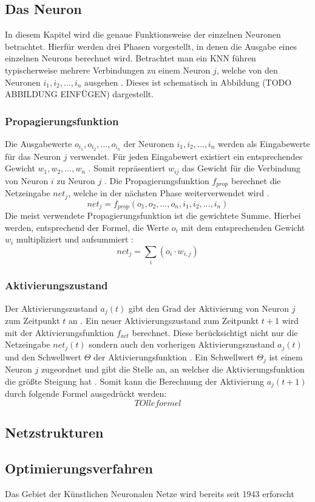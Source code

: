 \subsection{Das Neuron}
\label{subsec:neuron}
In diesem Kapitel wird die genaue Funktionsweise der einzelnen Neuronen betrachtet. Hierfür werden drei Phasen vorgestellt, in denen die Ausgabe eines einzelnen Neurons berechnet wird. Betrachtet man ein \ac{KNN} führen typischerweise mehrere Verbindungen zu einem Neuron $j$, welche von den Neuronen $i_1, i_2, ..., i_n$ ausgehen \cite{kriesel2008kleiner}. Dieses ist schematisch in Abbildung (TODO ABBILDUNG EINFÜGEN) dargestellt.

\subsubsection{Propagierungsfunktion} 
Die Ausgabewerte $o_{i_1}, o_{i_2}, ..., o_{i_n}$ der Neuronen $i_1, i_2, ..., i_n$ werden als Eingabewerte für das Neuron $j$ verwendet. Für jeden Eingabewert existiert ein entsprechendes Gewicht $w_1, w_2, ..., w_n$ \cite{kriesel2008kleiner}. Somit repräsentiert $w_{ij}$ das Gewicht für die Verbindung von Neuron $i$ zu Neuron $j$ \cite{zell2003simulation}. Die Propagierungsfunktion $f_{prop}$ berechnet die Netzeingabe $net_j$, welche in der nächsten Phase weiterverwendet wird \cite{kriesel2008kleiner}. 
$$net_j=f_{prop}(o_1, o_2, ..., o_n, i_1, i_2, ..., i_n)$$
Die meist verwendete Propagierungsfunktion ist die gewichtete Summe. Hierbei werden, entsprechend der Formel, die Werte $o_i$ mit dem entsprechenden Gewicht $w_i$ multipliziert und aufsummiert \cite{kriesel2008kleiner}:
$$net_j=\sum_{i}(o_{i} \cdot w_{i, j})$$

\subsubsection{Aktivierungszustand}
Der Aktivierungszustand $a_j(t)$ gibt den Grad der Aktivierung von Neuron $j$ zum Zeitpunkt $t$ an \cite{zell2003simulation}. Ein neuer Aktivierungszustand zum Zeitpunkt $t+1$ wird mit der Aktivierungsfunktion $f_{act}$ berechnet. Diese berücksichtigt nicht nur die Netzeingabe $net_j(t)$ sondern auch den vorherigen Aktivierungszustand $a_j(t)$ und den Schwellwert $\Theta$ der Aktivierungsfunktion \cite{zell2003simulation}. Ein Schwellwert $\Theta_j$ ist einem Neuron $j$ zugeordnet und gibt die Stelle an, an welcher die Aktivierungsfunktion die größte Steigung hat \cite{kriesel2008kleiner}. Somit kann die Berechnung der Aktivierung $a_j(t+1)$ durch folgende Formel ausgedrückt werden:
$$ TOlle formel$$


\subsection{Netzstrukturen}
\label{subsec:network_structures}
\subsection{Optimierungsverfahren}
\label{subsec:optimization_strategies}

Das Gebiet der Künstlichen Neuronalen Netze wird bereits seit 1943 erforscht